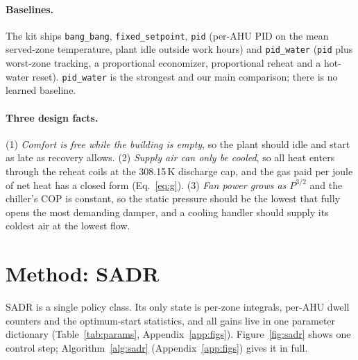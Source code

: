 \documentclass{article}
\begin{document}
\paragraph{Baselines.} The kit ships \texttt{bang\_bang}, \texttt{fixed\_setpoint}, \texttt{pid} (per-AHU PID on the mean served-zone temperature, plant idle outside work hours) and \texttt{pid\_water} (\texttt{pid} plus worst-zone tracking, a proportional economizer, proportional reheat and a hot-water reset). \texttt{pid\_water} is the strongest and our main comparison; there is no learned baseline.

\paragraph{Three design facts.} (1) \emph{Comfort is free while the building is empty}, so the plant should idle and start as late as recovery allows. (2) \emph{Supply air can only be cooled}, so all heat enters through the reheat coils at the 308.15\,K discharge cap, and the gas paid per joule of net heat has a closed form (Eq.~\ref{eq:g}). (3) \emph{Fan power grows as $P^{3/2}$} and the chiller's COP is constant, so the static pressure should be the lowest that fully opens the most demanding damper, and a cooling handler should supply its coldest air at the lowest flow.

\section{Method: SADR}
\label{sec:method}

SADR is a single policy class. Its only state is per-zone integrals, per-AHU dwell counters and the optimum-start statistics, and all gains live in one parameter dictionary (Table~\ref{tab:params}, Appendix~\ref{app:figs}). Figure~\ref{fig:sadr} shows one control step; Algorithm~\ref{alg:sadr} (Appendix~\ref{app:figs}) gives it in full.
\end{document}
